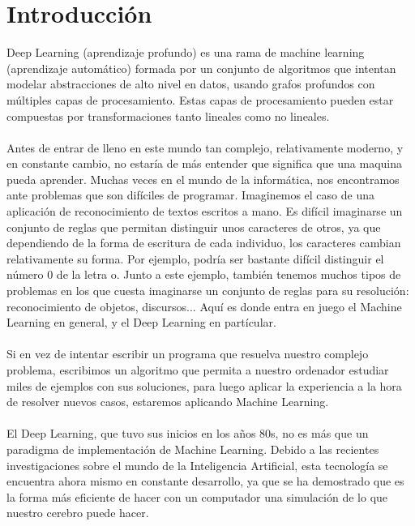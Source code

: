 \chapter{Introducción}
\label{chap:intro}

\vspace{-0.2cm}

Deep Learning (aprendizaje profundo) es una rama de machine learning (aprendizaje automático) formada por un conjunto de algoritmos que intentan modelar abstracciones de alto nivel en datos, usando grafos profundos con múltiples capas de procesamiento. Estas capas de procesamiento pueden estar compuestas por transformaciones tanto lineales como no lineales.\\\\
Antes de entrar de lleno en este mundo tan complejo, relativamente moderno, y en constante cambio, no estaría de más entender que significa que una maquina pueda aprender. Muchas veces en el mundo de la informática, nos encontramos ante problemas que son difíciles de programar. Imaginemos el caso de una aplicación de reconocimiento de textos escritos a mano. Es difícil imaginarse un conjunto de reglas que permitan distinguir unos caracteres de otros, ya que dependiendo de la forma de escritura de cada individuo, los caracteres cambian relativamente su forma. Por ejemplo, podría ser bastante difícil distinguir el número 0 de la letra o. Junto a este ejemplo, también tenemos muchos tipos de problemas en los que cuesta imaginarse un conjunto de reglas para su resolución: reconocimiento de objetos, discursos... Aquí es donde entra en juego el Machine Learning en general, y el Deep Learning en partícular.\\\\
Si en vez de intentar escribir un programa que resuelva nuestro complejo problema, escribimos un algoritmo que permita a nuestro ordenador estudiar miles de ejemplos con sus soluciones, para luego aplicar la experiencia a la hora de resolver nuevos casos, estaremos aplicando Machine Learning.\\\\
El Deep Learning, que tuvo sus inicios en los años 80s, no es más que un paradigma de implementación de Machine Learning. Debido a las recientes investigaciones sobre el mundo de la Inteligencia Artificial, esta tecnología se encuentra ahora mismo en constante desarrollo, ya que se ha demostrado que es la forma más eficiente de hacer con un computador una simulación de lo que nuestro cerebro puede hacer.

